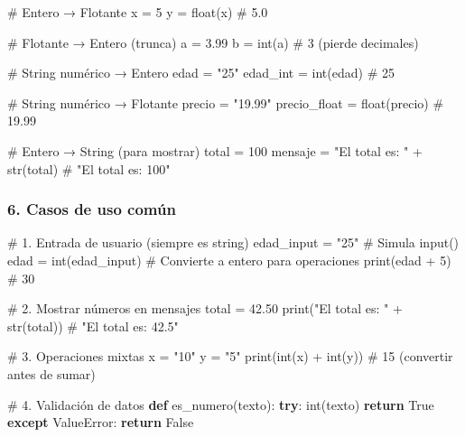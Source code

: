 \documentclass[
  doc,
  floatsintext,
  longtable,
  a4paper,
  nolmodern,
  notxfonts,
  notimes,
  12pt,
  colorlinks=true,linkcolor=blue,citecolor=blue,urlcolor=blue]{apa7}
\newenvironment{Shaded}{\begin{snugshade}}{\end{snugshade}}
\newcommand{\BuiltInTok}[1]{\textcolor[rgb]{0.00,0.23,0.31}{#1}}
\newcommand{\CommentTok}[1]{\textcolor[rgb]{0.37,0.37,0.37}{#1}}
\newcommand{\ControlFlowTok}[1]{\textcolor[rgb]{0.00,0.23,0.31}{\textbf{#1}}}
\newcommand{\DecValTok}[1]{\textcolor[rgb]{0.68,0.00,0.00}{#1}}
\newcommand{\FloatTok}[1]{\textcolor[rgb]{0.68,0.00,0.00}{#1}}
\newcommand{\KeywordTok}[1]{\textcolor[rgb]{0.00,0.23,0.31}{\textbf{#1}}}
\newcommand{\NormalTok}[1]{\textcolor[rgb]{0.00,0.23,0.31}{#1}}
\newcommand{\OperatorTok}[1]{\textcolor[rgb]{0.37,0.37,0.37}{#1}}
\newcommand{\PreprocessorTok}[1]{\textcolor[rgb]{0.68,0.00,0.00}{#1}}
\newcommand{\StringTok}[1]{\textcolor[rgb]{0.13,0.47,0.30}{#1}}
\newcommand{\VariableTok}[1]{\textcolor[rgb]{0.07,0.07,0.07}{#1}}
\begin{document}
\begin{Shaded}
\begin{Highlighting}[]
\CommentTok{\# Entero → Flotante}
\NormalTok{x }\OperatorTok{=} \DecValTok{5}
\NormalTok{y }\OperatorTok{=} \BuiltInTok{float}\NormalTok{(x)  }\CommentTok{\# 5.0}

\CommentTok{\# Flotante → Entero (trunca)}
\NormalTok{a }\OperatorTok{=} \FloatTok{3.99}
\NormalTok{b }\OperatorTok{=} \BuiltInTok{int}\NormalTok{(a)    }\CommentTok{\# 3 (pierde decimales)}

\CommentTok{\# String numérico → Entero}
\NormalTok{edad }\OperatorTok{=} \StringTok{"25"}
\NormalTok{edad\_int }\OperatorTok{=} \BuiltInTok{int}\NormalTok{(edad)  }\CommentTok{\# 25}

\CommentTok{\# String numérico → Flotante}
\NormalTok{precio }\OperatorTok{=} \StringTok{"19.99"}
\NormalTok{precio\_float }\OperatorTok{=} \BuiltInTok{float}\NormalTok{(precio)  }\CommentTok{\# 19.99}

\CommentTok{\# Entero → String (para mostrar)}
\NormalTok{total }\OperatorTok{=} \DecValTok{100}
\NormalTok{mensaje }\OperatorTok{=} \StringTok{"El total es: "} \OperatorTok{+} \BuiltInTok{str}\NormalTok{(total)  }\CommentTok{\# "El total es: 100"}
\end{Highlighting}
\end{Shaded}

\subsubsection{6. Casos de uso común}\label{casos-de-uso-comuxfan}

\begin{Shaded}
\begin{Highlighting}[]
\CommentTok{\# 1. Entrada de usuario (siempre es string)}
\NormalTok{edad\_input }\OperatorTok{=} \StringTok{"25"}  \CommentTok{\# Simula input()}
\NormalTok{edad }\OperatorTok{=} \BuiltInTok{int}\NormalTok{(edad\_input)  }\CommentTok{\# Convierte a entero para operaciones}
\BuiltInTok{print}\NormalTok{(edad }\OperatorTok{+} \DecValTok{5}\NormalTok{)  }\CommentTok{\# 30}

\CommentTok{\# 2. Mostrar números en mensajes}
\NormalTok{total }\OperatorTok{=} \FloatTok{42.50}
\BuiltInTok{print}\NormalTok{(}\StringTok{"El total es: "} \OperatorTok{+} \BuiltInTok{str}\NormalTok{(total))  }\CommentTok{\# "El total es: 42.5"}

\CommentTok{\# 3. Operaciones mixtas}
\NormalTok{x }\OperatorTok{=} \StringTok{"10"}
\NormalTok{y }\OperatorTok{=} \StringTok{"5"}
\BuiltInTok{print}\NormalTok{(}\BuiltInTok{int}\NormalTok{(x) }\OperatorTok{+} \BuiltInTok{int}\NormalTok{(y))  }\CommentTok{\# 15 (convertir antes de sumar)}

\CommentTok{\# 4. Validación de datos}
\KeywordTok{def}\NormalTok{ es\_numero(texto):}
    \ControlFlowTok{try}\NormalTok{:}
        \BuiltInTok{int}\NormalTok{(texto)}
        \ControlFlowTok{return} \VariableTok{True}
    \ControlFlowTok{except} \PreprocessorTok{ValueError}\NormalTok{:}
        \ControlFlowTok{return} \VariableTok{False}
\end{Highlighting}
\end{Shaded}
\end{document}
